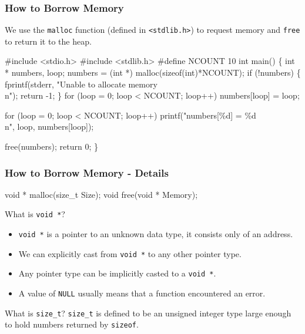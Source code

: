 \documentclass[table]{beamer}
\newif\ifschigh\schighfalse
\newcommand{\kw}[1]{\ifschigh\textcolor{red}{#1}\else\textcolor{keyword}{#1}\fi}
\newcommand{\kt}[1]{\ifschigh\textcolor{red}{#1}\else\textcolor{ctext}{#1}\fi}
\newcounter{sckll}
\newcommand{\kr}{\setcounter{sckll}{1}}
\newcommand{\kl}{}
\begin{document}
\begin{frame}[fragile]
\frametitle{How to Borrow Memory}
We use the {\tt malloc} function (defined in \kt{\tt <stdlib.h>}) to request memory and {\tt free} to return it to the heap.
\vspace{-0.1in}
\begin{semiverbatim}
\scriptsize
\kr\kl\kw{\#include} \kt{<stdio.h>}
\kl\kw{\#include} \kt{<stdlib.h>}
\kl\kw{\#define} NCOUNT 10
\kl\kw{int} main()
\kl\{
\kl   \kw{int} * numbers, loop;
\kl   numbers = (\kw{int} *) malloc(\kw{sizeof}(\kw{int})*NCOUNT);
\kl   \kw{if} (!numbers)
\kl   \{
\kl      fprintf(stderr, \kt{"Unable to allocate memory\\n"});
\kl      return -1;
\kl   \}
\kl   \kw{for} (loop = 0; loop < NCOUNT; loop++)
\kl      numbers[loop] = loop;
\kl
\kl   \kw{for} (loop = 0; loop < NCOUNT; loop++)
\kl      printf(\kt{"numbers[\%d] = \%d\\n"}, loop, numbers[loop]);
\kl
\kl   \kw{free}(numbers);
\kl   \kw{return} 0;
\kl\}
\end{semiverbatim}
\end{frame}

\begin{frame}[fragile]
\frametitle{How to Borrow Memory - Details}
\begin{semiverbatim}
      \kw{void} * malloc(size_t Size);
      \kw{void} free(\kw{void} * Memory);
\end{semiverbatim}
\begin{block}{What is {\tt void *}?}
\begin{itemize}
\item {\tt \kw{void} *} is a pointer to an unknown data type, it consists only of an address.
\item We can explicitly cast from {\tt \kw{void} *} to any other pointer type.
\item Any pointer type can be implicitly casted to a {\tt \kw{void} *}.
\item A value of {\tt NULL} usually means that a function encountered an error.
\end{itemize}
\end{block}

\begin{block}{What is {\tt size\_t}?}
{\tt size\_t} is defined to be an unsigned integer type large enough to hold numbers returned by {\tt \kw{sizeof}}.
\end{block}
\end{frame}
\end{document}
